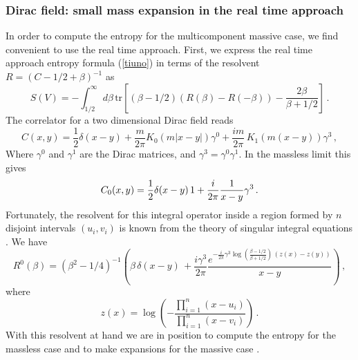 \documentclass[11pt]{article}
\begin{document}
\subsubsection{Dirac field: small mass expansion in the real time approach}

In order to compute the entropy for the multicomponent massive case, we find convenient to use the real time approach. 
First, we express the real time approach entropy formula (\ref{tiuno}) in terms of the resolvent $R=(C-1/2+\beta)^{-1}$ as
\begin{equation}
S(V)=-\int^\infty_{1/2} d\beta\, \textrm{tr}\left[\left(\beta-1/2\right) \left(R(\beta)-R(-\beta)\right)-\frac{2\beta}{\beta+1/2}\right]\,.\label{fas}
\end{equation}  
The correlator for a two dimensional Dirac field reads 
\begin{equation}
C(x,y)=\frac{1}{2} \delta(x-y) +\frac{m}{2\pi} K_0(m|x-y|) \gamma^0  +\frac{i m}{2 \pi} \, K_1(m (x-y)) \gamma^3  \,,\label{crosta}
\end{equation}
Where $\gamma^0$ and $\gamma^1$ are the Dirac matrices, and $\gamma^3=\gamma^0 \gamma^1$. 
In the massless limit this gives 
\begin{equation}
C_0 (x,y)=\frac{1}{2} \delta(x-y)\, 
 1+ \frac{i}{2\pi}\frac{1}{x-y} \gamma^3\,. \label{hora}\\
\end{equation} 
Fortunately, the resolvent for this integral operator inside a region formed by $n$ disjoint intervals $(u_i,v_i)$ is known from the theory of singular integral equations  \cite{reso}. We have  
\begin{equation}       
R^0(\beta) =\left(\beta^2-1/4 \right)^{-1}
\left(\beta\,\delta(x-y)\, 
+\frac{i \gamma^3}{2\pi}   \frac{e^{-\frac{i}{2\pi}\gamma^3 \log\left(\frac{\beta-1/2}{\beta+1/2}\right)\, (z(x)-z(y)) }}{x-y}
\right)\,,\label{reso}
\end{equation}
where
\begin{equation}
z(x)=\log\left(-\frac{\prod_{i=1}^n (x-u_i)}{\prod_{i=1}^n (x-v_i)}\right) \,. \label{bfbf}
\end{equation}
With this resolvent at hand we are in position to compute the entropy for the massless case and to make expansions for the massive case \cite{futuro}.
\end{document}
